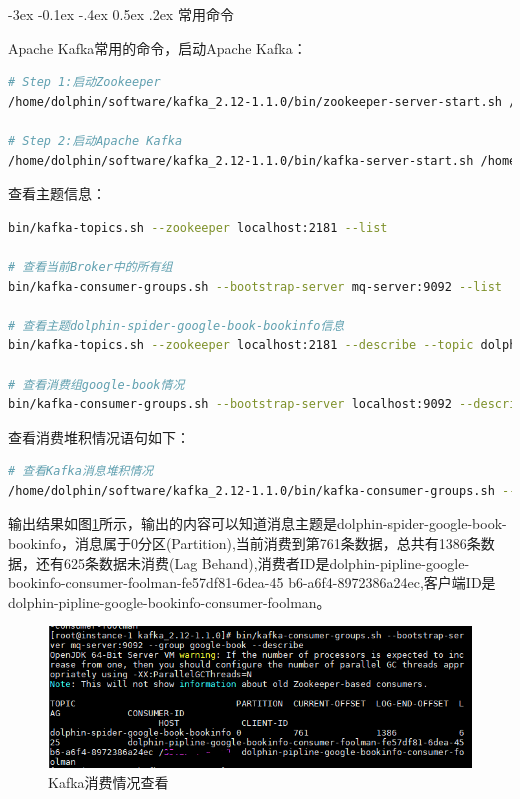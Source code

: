 \documentclass[8pt]{book}
\makeatletter
\numberwithin{dummy}{section}
\theoremstyle{ocrenumbox}
\theoremstyle{blacknumex}
\theoremstyle{blacknumbox}
\theoremstyle{ocrenum}
\renewcommand{\subsection}{\@startsection {subsection}{2}{\z@}
	{-3ex \@plus -0.1ex \@minus -.4ex}
	{0.5ex \@plus.2ex }
	{\normalfont\sffamily\bfseries}}
\makeatother
\begin{document}
\subsection{常用命令}

Apache Kafka常用的命令，启动Apache Kafka：

\begin{lstlisting}[language=Bash]
# Step 1:启动Zookeeper
/home/dolphin/software/kafka_2.12-1.1.0/bin/zookeeper-server-start.sh /home/dolphin/software/kafka_2.12-1.1.0/config/zookeeper.properties

# Step 2:启动Apache Kafka
/home/dolphin/software/kafka_2.12-1.1.0/bin/kafka-server-start.sh /home/dolphin/software/kafka_2.12-1.1.0/config/server.properties
\end{lstlisting}

查看主题信息：

\begin{lstlisting}[language=Bash]
bin/kafka-topics.sh --zookeeper localhost:2181 --list

# 查看当前Broker中的所有组
bin/kafka-consumer-groups.sh --bootstrap-server mq-server:9092 --list

# 查看主题dolphin-spider-google-book-bookinfo信息
bin/kafka-topics.sh --zookeeper localhost:2181 --describe --topic dolphin-spider-google-book-bookinfo

# 查看消费组google-book情况
bin/kafka-consumer-groups.sh --bootstrap-server localhost:9092 --describe --group google-book
\end{lstlisting}

查看消费堆积情况语句如下：

\begin{lstlisting}[language=Bash]
# 查看Kafka消息堆积情况
/home/dolphin/software/kafka_2.12-1.1.0/bin/kafka-consumer-groups.sh --bootstrap-server mq-server:9092 --group google-book --describe
\end{lstlisting}

输出结果如图\ref{fig:kafkaconsumecheck}所示，输出的内容可以知道消息主题是dolphin-spider-google-book-bookinfo，消息属于0分区(Partition),当前消费到第761条数据，总共有1386条数据，还有625条数据未消费(Lag Behand),消费者ID是dolphin-pipline-google-bookinfo-consumer-foolman-fe57df81-6dea-45                                                                    b6-a6f4-8972386a24ec,客户端ID是dolphin-pipline-google-bookinfo-consumer-foolman。

\begin{figure}[htbp]
	\centering
	\includegraphics[scale=0.7]{kafkaconsumecheck.png}
	\caption{Kafka消费情况查看}
	\label{fig:kafkaconsumecheck}
\end{figure}
\end{document}
